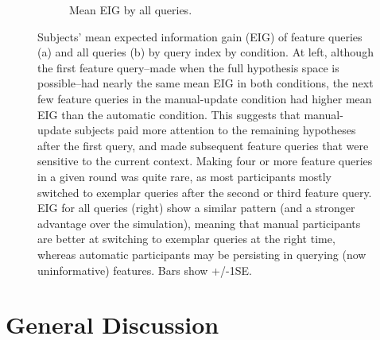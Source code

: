 \documentclass[man,floatsintext]{apa6}
\begin{document}
\begin{figure}[t]
\begin{subfigure}{.43\textwidth}
  \caption{Mean EIG by all queries.}
  \label{fig:sfig2}
\end{subfigure}
  \caption{Subjects' mean expected information gain (EIG) of feature queries (a) and all queries (b) by query index by condition. At left, although the first feature query--made when the full hypothesis space is possible--had nearly the same mean EIG in both conditions, the next few feature queries in the manual-update condition had higher mean EIG than the automatic condition. This suggests that manual-update subjects paid more attention to the remaining hypotheses after the first query, and made subsequent feature queries that were sensitive to the current context. Making four or more feature queries in a given round was quite rare, as most participants mostly switched to exemplar queries after the second or third feature query. EIG for all queries (right) show a similar pattern (and a stronger advantage over the simulation), meaning that manual participants are better at switching to exemplar queries at the right time, whereas automatic participants may be persisting in querying (now uninformative) features. Bars show +/-1SE.}
  \label{fig:EIG_by_click}
 \end{figure} 



\section{General Discussion}
\end{document}
